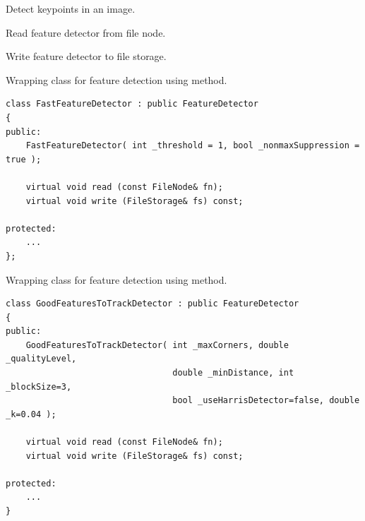 Detect keypoints in an image.


\begin{description}
\end{description}

Read feature detector from file node.


\begin{description}
\end{description}

Write feature detector to file storage.


\begin{description}
\end{description}

Wrapping class for feature detection using  method.

\begin{lstlisting}
class FastFeatureDetector : public FeatureDetector
{
public:
    FastFeatureDetector( int _threshold = 1, bool _nonmaxSuppression = true );
    
    virtual void read (const FileNode& fn);
    virtual void write (FileStorage& fs) const;
    
protected:
	...
};
\end{lstlisting}

Wrapping class for feature detection using  method.

\begin{lstlisting}
class GoodFeaturesToTrackDetector : public FeatureDetector
{
public:
    GoodFeaturesToTrackDetector( int _maxCorners, double _qualityLevel, 
                                 double _minDistance, int _blockSize=3,
                                 bool _useHarrisDetector=false, double _k=0.04 );
                                 
    virtual void read (const FileNode& fn);
    virtual void write (FileStorage& fs) const;
    
protected:
	...
}
\end{lstlisting}

